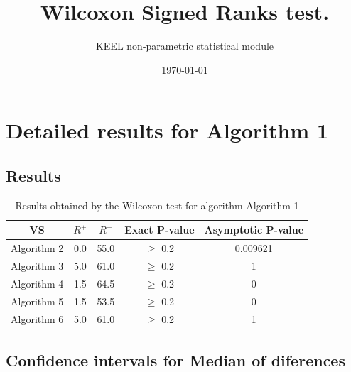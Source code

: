 \documentclass[a4paper,10pt]{article}
\title{Wilcoxon Signed Ranks test.}
\date{\today}
\author{KEEL non-parametric statistical module}
\begin{document}
\pagestyle{empty}
\maketitle
\thispagestyle{empty}



\section{Detailed results for Algorithm 1}


\subsection{Results}

\begin{table}[!htp]
\centering\small
\begin{tabular}{
|c|c|c|c|c|}
\hline
 VS & $R^{+}$ & $R^{-}$ & Exact P-value & Asymptotic P-value \\ \hline 
Algorithm 2 & 0.0 & 55.0 & $\geq$ 0.2 & 0.009621\\ \hline 
Algorithm 3 & 5.0 & 61.0 & $\geq$ 0.2 & 1\\ \hline 
Algorithm 4 & 1.5 & 64.5 & $\geq$ 0.2 & 0\\ \hline 
Algorithm 5 & 1.5 & 53.5 & $\geq$ 0.2 & 0\\ \hline 
Algorithm 6 & 5.0 & 61.0 & $\geq$ 0.2 & 1\\ \hline 

\end{tabular}
\caption{Results obtained by the Wilcoxon test for algorithm Algorithm 1}
\end{table}

\subsection{Confidence intervals for Median of diferences}
\end{document}
